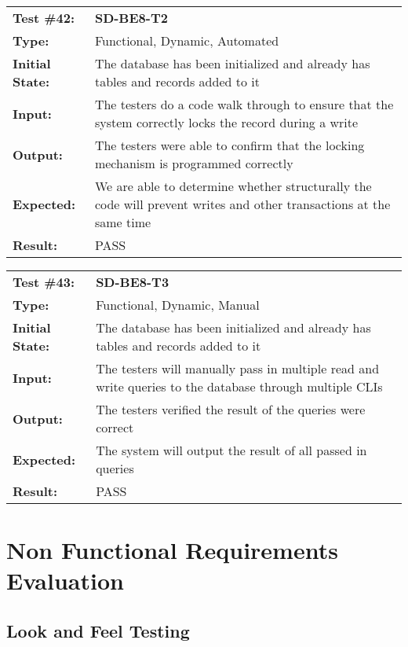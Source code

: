 \documentclass[12pt, titlepage]{article}
\begin{document}
\begin{mdframed}[linewidth=1pt]
\begin{tabularx}{\textwidth}{@{}p{3cm}X@{}}
{\bf Test \#42:} & {\bf SD-BE8-T2}\\[\baselineskip]
{\bf Type:} & Functional, Dynamic, Automated \\[0.5\baselineskip]
{\bf Initial State:} & The database has been initialized and already has tables and records added to it \\[\baselineskip]
{\bf Input:} & The testers do a code walk through to ensure that the system correctly locks the record during a write \\[\baselineskip]
{\bf Output:} & The testers were able to confirm that the locking mechanism is programmed correctly \\[\baselineskip]
{\bf Expected:} & We are able to determine whether structurally the code will prevent writes and other transactions at the same time \\[\baselineskip]
{\bf Result:} & PASS
\end{tabularx}
\end{mdframed}

\begin{mdframed}[linewidth=1pt]
\begin{tabularx}{\textwidth}{@{}p{3cm}X@{}}
{\bf Test \#43:} & {\bf SD-BE8-T3}\\[\baselineskip]
{\bf Type:} & Functional, Dynamic, Manual \\[0.5\baselineskip]
{\bf Initial State:} & The database has been initialized and already has tables and records added to it \\[\baselineskip]
{\bf Input:} & The testers will manually pass in multiple read and write queries to the database through multiple CLIs  \\[\baselineskip]
{\bf Output:} & The testers verified the result of the queries were correct \\[\baselineskip]
{\bf Expected:} & The system will output the result of all passed in queries \\[\baselineskip]
{\bf Result:} & PASS
\end{tabularx}
\end{mdframed}

\section{Non Functional Requirements Evaluation}
\subsection{Look and Feel Testing}
\end{document}
